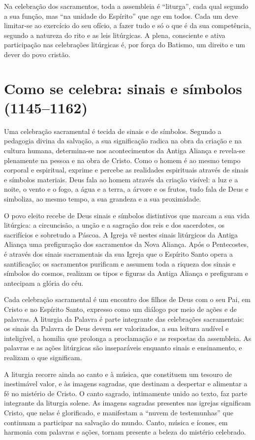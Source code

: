 Na celebração dos sacramentos, toda a assembleia é ``liturga'', cada qual segundo a sua função, mas ``na unidade do Espírito'' que age em todos. Cada um deve limitar-se ao exercício do seu ofício, a fazer tudo e só o que é da sua competência, segundo a natureza do rito e as leis litúrgicas. A plena, consciente e ativa participação nas celebrações litúrgicas é, por força do Batismo, um direito e um dever do povo cristão.

\section{Como se celebra: sinais e símbolos (1145--1162)}

Uma celebração sacramental é tecida de sinais e de símbolos. Segundo a pedagogia divina da salvação, a sua significação radica na obra da criação e na cultura humana, determina-se nos acontecimentos da Antiga Aliança e revela-se plenamente na pessoa e na obra de Cristo. Como o homem é ao mesmo tempo corporal e espiritual, exprime e percebe as realidades espirituais através de sinais e símbolos materiais. Deus fala ao homem através da criação visível: a luz e a noite, o vento e o fogo, a água e a terra, a árvore e os frutos, tudo fala de Deus e simboliza, ao mesmo tempo, a sua grandeza e a sua proximidade.

O povo eleito recebe de Deus sinais e símbolos distintivos que marcam a sua vida litúrgica: a circuncisão, a unção e a sagração dos reis e dos sacerdotes, os sacrifícios e sobretudo a Páscoa. A Igreja vê nestes sinais litúrgicos da Antiga Aliança uma prefiguração dos sacramentos da Nova Aliança. Após o Pentecostes, é através dos sinais sacramentais da sua Igreja que o Espírito Santo opera a santificação; os sacramentos purificam e assumem toda a riqueza dos sinais e símbolos do cosmos, realizam os tipos e figuras da Antiga Aliança e prefiguram e antecipam a glória do céu.

Cada celebração sacramental é um encontro dos filhos de Deus com o seu Pai, em Cristo e no Espírito Santo, expresso como um diálogo por meio de ações e de palavras. A liturgia da Palavra é parte integrante das celebrações sacramentais: os sinais da Palavra de Deus devem ser valorizados, a sua leitura audível e inteligível, a homilia que prolonga a proclamação e as respostas da assembleia. As palavras e as ações litúrgicas são inseparáveis enquanto sinais e ensinamento, e realizam o que significam.

A liturgia recorre ainda ao canto e à música, que constituem um tesouro de inestimável valor, e às imagens sagradas, que destinam a despertar e alimentar a fé no mistério de Cristo. O canto sagrado, intimamente unido ao texto, faz parte integrante da liturgia solene. As imagens sagradas presentes nas igrejas significam Cristo, que nelas é glorificado, e manifestam a ``nuvem de testemunhas'' que continuam a participar na salvação do mundo. Canto, música e ícones, em harmonia com palavras e ações, tornam presente a beleza do mistério celebrado.

